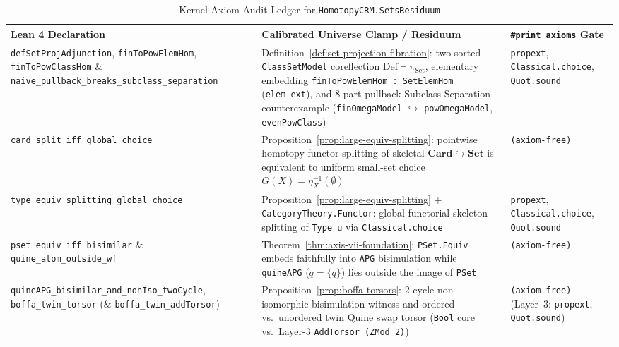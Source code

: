 \begin{table}[htbp]
\centering
\caption{Kernel Axiom Audit Ledger for \texttt{HomotopyCRM.SetsResiduum}}\label{tab:sets-residuum-audit}
\vspace{0.3em}
{\scriptsize\setlength{\tabcolsep}{2.5pt}\renewcommand{\arraystretch}{1.12}%
\begin{tabularx}{\textwidth}{@{}P{0.27\textwidth}YP{0.21\textwidth}@{}}
\toprule
\textbf{Lean 4 Declaration} & \textbf{Calibrated Universe Clamp / Residuum} & \textbf{\texttt{\#print axioms} Gate} \\
\midrule
\texttt{defSetProjAdjunction}, \texttt{finToPowElemHom}, \texttt{finToPowClassHom} \& \texttt{naive\_\allowbreak pullback\_\allowbreak breaks\_\allowbreak subclass\_\allowbreak separation} & Definition~\ref{def:set-projection-fibration}: two-sorted \texttt{ClassSetModel} coreflection $\mathrm{Def} \dashv \pi_{\mathrm{Set}}$, elementary embedding \texttt{finToPowElemHom : SetElemHom} (\texttt{elem\_ext}), and $8$-part pullback Subclass-Separation counterexample (\texttt{finOmegaModel} $\hookrightarrow$ \texttt{powOmegaModel}, \texttt{evenPowClass}) & \texttt{propext}, \texttt{Classical.choice}, \texttt{Quot.sound} \\
\texttt{card\_\allowbreak split\_\allowbreak iff\_\allowbreak global\_\allowbreak choice} & Proposition~\ref{prop:large-equiv-splitting}: pointwise homotopy-functor splitting of skeletal $\mathbf{Card} \hookrightarrow \mathbf{Set}$ is equivalent to uniform small-set choice $G(X)=\eta_X^{-1}(\emptyset)$ & \texttt{(axiom-free)} \\
\texttt{type\_\allowbreak equiv\_\allowbreak splitting\_\allowbreak global\_\allowbreak choice} & Proposition~\ref{prop:large-equiv-splitting} + \texttt{CategoryTheory.Functor}: global functorial skeleton splitting of \texttt{Type u} via \texttt{Classical.choice} & \texttt{propext}, \texttt{Classical.choice}, \texttt{Quot.sound} \\
\texttt{pset\_\allowbreak equiv\_\allowbreak iff\_\allowbreak bisimilar} \& \texttt{quine\_\allowbreak atom\_\allowbreak outside\_\allowbreak wf} & Theorem~\ref{thm:axis-vii-foundation}: \texttt{PSet.Equiv} embeds faithfully into \texttt{APG} bisimulation while \texttt{quineAPG} ($q=\{q\}$) lies outside the image of \texttt{PSet} & \texttt{(axiom-free)} \\
\texttt{quineAPG\_\allowbreak bisimilar\_\allowbreak and\_\allowbreak nonIso\_\allowbreak twoCycle}, \texttt{boffa\_\allowbreak twin\_\allowbreak torsor} (\& \texttt{boffa\_\allowbreak twin\_\allowbreak addTorsor}) & Proposition~\ref{prop:boffa-torsors}: $2$-cycle non-isomorphic bisimulation witness and ordered vs.\ unordered twin Quine swap torsor (\texttt{Bool} core vs.\ Layer-3 \texttt{AddTorsor (ZMod 2)}) & \texttt{(axiom-free)} (Layer~3: \texttt{propext}, \texttt{Quot.sound}) \\

\end{tabularx}}
\end{table}
